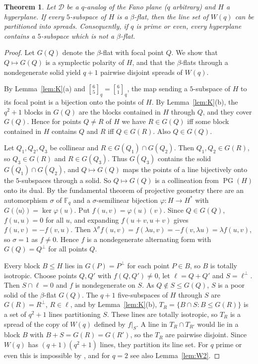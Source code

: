 \documentclass[11pt]{amsart}
\newtheorem{theorem}{Theorem}[section]
\theoremstyle{definition}
\newcommand{\F}{\mathbb{F}}
\newcommand{\gauss}[3]{\genfrac{[}{]}{0pt}{}{#1}{#2}_{#3}}
\newcommand{\D}{\mathcal{D}}
\newcommand{\PG}{\operatorname{PG}}
\begin{document}
\begin{theorem}\label{thm:A}
Let $\D$ be a $q$-analog of the Fano plane \textup{(}$q$ arbitrary\textup{)} and $H$ a hyperplane. If every $5$-subspace of $H$ is a $\beta$-flat, then the line set of $W(q)$ can be partitioned into spreads. Consequently, if $q$ is prime or even, every hyperplane contains a $5$-subspace which is not a $\beta$-flat.
\end{theorem}
\begin{proof}
Let $G(Q)$ denote the $\beta$-flat with focal point $Q$. We show that $Q\mapsto G(Q)$ is a symplectic polarity of $H$, and that the $\beta$-flats through a nondegenerate solid yield $q+1$ pairwise disjoint spreads of $W(q)$.

By Lemma~\ref{lem:K}(a) and $\gauss65q=\gauss61q$, the map sending a $5$-subspace of $H$ to its focal point is a bijection onto the points of $H$. By Lemma~\ref{lem:K}(b), the $q^2+1$ blocks in $G(Q)$ are the blocks contained in $H$ through $Q$, and they cover $G(Q)$. Hence for points $Q\ne R$ of $H$ we have $R\in G(Q)$ iff some block contained in $H$ contains $Q$ and $R$ iff $Q\in G(R)$. Also $Q\in G(Q)$.

Let $Q_1,Q_2,Q_3$ be collinear and $R\in G(Q_1)\cap G(Q_2)$. Then $Q_1,Q_2\in G(R)$, so $Q_3\in G(R)$ and $R\in G(Q_3)$. Thus $G(Q_3)$ contains the solid $G(Q_1)\cap G(Q_2)$, and $Q\mapsto G(Q)$ maps the points of a line bijectively onto the $5$-subspaces through a solid. So $Q\mapsto G(Q)$ is a collineation from $\PG(H)$ onto its dual. By the fundamental theorem of projective geometry \cite{Tay92} there are an automorphism $\sigma$ of $\F_q$ and a $\sigma$-semilinear bijection $\varphi:H\to H^*$ with $G(\langle u\rangle)=\ker\varphi(u)$. Put $f(u,v)=\varphi(u)(v)$. Since $Q\in G(Q)$, $f(u,u)=0$ for all $u$, and expanding $f(u+v,u+v)$ gives $f(u,v)=-f(v,u)$. Then $\lambda^\sigma f(u,v)=f(\lambda u,v)=-f(v,\lambda u)=\lambda f(u,v)$, so $\sigma=1$ as $f\ne0$. Hence $f$ is a nondegenerate alternating form with $G(Q)=Q^\perp$ for all points $Q$.

Every block $B\le H$ lies in $G(P)=P^\perp$ for each point $P\in B$, so $B$ is totally isotropic. Choose points $Q,Q'$ with $f(Q,Q')\ne0$, let $\ell=Q+Q'$ and $S=\ell^\perp$. Then $S\cap\ell=0$ and $f$ is nondegenerate on $S$. As $Q\notin S\le G(Q)$, $S$ is a poor solid of the $\beta$-flat $G(Q)$. The $q+1$ five-subspaces of $H$ through $S$ are $G(R)=R^\perp$, $R\in\ell$, and by Lemma~\ref{lem:K}(b), $T_R=\{B\cap S:B\le G(R)\}$ is a set of $q^2+1$ lines partitioning $S$. These lines are totally isotropic, so $T_R$ is a spread of the copy of $W(q)$ defined by $f|_S$. A line in $T_R\cap T_{R'}$ would lie in a block $B$ with $B+S=G(R)=G(R')$, so the $T_R$ are pairwise disjoint. Since $W(q)$ has $(q+1)(q^2+1)$ lines, they partition its line set. For $q$ prime or even this is impossible by \cite[proof of Thm.~2]{Kie22}, and for $q=2$ see also Lemma~\ref{lem:W2}.
\end{proof}
\end{document}
